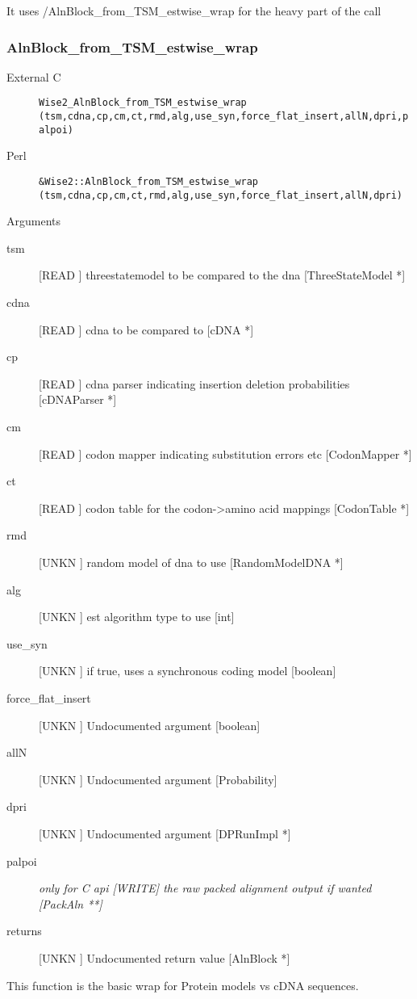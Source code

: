 It uses /AlnBlock_from_TSM_estwise_wrap for the
heavy part of the call


\subsubsection{AlnBlock_from_TSM_estwise_wrap}
\begin{description}
\item[External C] {\tt Wise2_AlnBlock_from_TSM_estwise_wrap (tsm,cdna,cp,cm,ct,rmd,alg,use_syn,force_flat_insert,allN,dpri,palpoi)}
\item[Perl] {\tt &Wise2::AlnBlock_from_TSM_estwise_wrap (tsm,cdna,cp,cm,ct,rmd,alg,use_syn,force_flat_insert,allN,dpri)}

\end{description}
Arguments
\begin{description}
\item[tsm] [READ ] threestatemodel to be compared to the dna [ThreeStateModel *]
\item[cdna] [READ ] cdna to be compared to [cDNA *]
\item[cp] [READ ] cdna parser indicating insertion deletion probabilities [cDNAParser *]
\item[cm] [READ ] codon mapper indicating substitution errors etc [CodonMapper *]
\item[ct] [READ ] codon table for the codon->amino acid mappings [CodonTable *]
\item[rmd] [UNKN ] random model of dna to use [RandomModelDNA *]
\item[alg] [UNKN ] est algorithm type to use [int]
\item[use_syn] [UNKN ] if true, uses a synchronous coding model [boolean]
\item[force_flat_insert] [UNKN ] Undocumented argument [boolean]
\item[allN] [UNKN ] Undocumented argument [Probability]
\item[dpri] [UNKN ] Undocumented argument [DPRunImpl *]
\item[palpoi] \em{only for C api} [WRITE] the raw packed alignment output if wanted [PackAln **]
\item[returns] [UNKN ] Undocumented return value [AlnBlock *]
\end{description}
This function is the basic wrap for Protein models
vs cDNA sequences.


